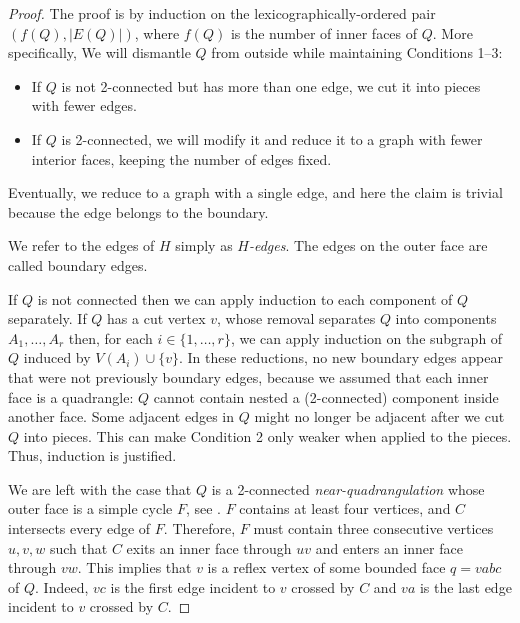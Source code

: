 \documentclass{patmorin}
\begin{document}
\begin{proof}
The proof is by induction
   on the lexicographically-ordered pair $(f(Q),|E(Q)|)$, where $f(Q)$
is the number of inner faces of $Q$. 
More specifically, %
We will dismantle $Q$
 from outside while maintaining
 Conditions 1--3:
\begin{itemize}
\item If $Q$ is not 2-connected but has more than one edge, we cut it
  into pieces with fewer edges.
\item If $Q$ is 2-connected, we will modify it and reduce it to a
  graph
with fewer interior faces,
keeping the number of edges fixed.
\end{itemize}
Eventually, we reduce to a graph with a single edge, and here the
claim is trivial because the edge belongs to the boundary.

   We refer to the edges of $H$ simply as \emph{$H$-edges}.
The edges on the outer
   face are called boundary edges.

If $Q$ is not connected then we can apply induction to each component
   of $Q$ separately. If $Q$ has a cut vertex $v$, whose removal
   separates $Q$ into components $A_1,\ldots,A_r$ then, for each
   $i\in\{1,\ldots,r\}$, we can apply induction on the subgraph of $Q$
   induced by $V(A_i)\cup\{v\}$.  
In these reductions, no new boundary edges appear that were not
previously boundary edges, because we assumed that each inner face is
a quadrangle: $Q$ cannot contain nested a (2-connected) component
inside another face.
Some adjacent edges in $Q$ might no longer be adjacent
after we cut $Q$ into pieces. This can make Condition 2 only weaker
when applied to the pieces. Thus, induction is justified.

We are left with the case that $Q$ is a 2-connected \emph{near-quadrangulation} whose outer face 
   is a simple cycle $F$, see .
$F$ contains at least four vertices, and $C$ intersects
   every edge of $F$.  Therefore,  
   $F$
    must contain three consecutive vertices
   $u,v,w$ such that $C$ exits an inner face through $uv$ and enters
   an inner face through $vw$.  This implies that $v$ is a reflex vertex
   of some bounded face $q=vabc$ of $Q$.  Indeed, $vc$ is the first edge
   incident to $v$ crossed by $C$ and $va$ is the last edge incident to
   $v$ crossed by $C$.


\end{proof}
\end{document}
